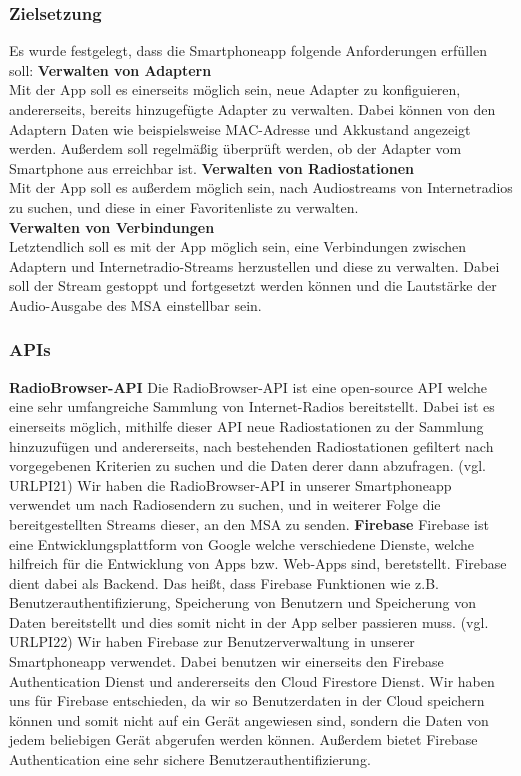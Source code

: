 \documentclass[11pt, twoside]{article}
\begin{document}
\subsubsection{Zielsetzung}
Es wurde festgelegt, dass die Smartphoneapp folgende Anforderungen erfüllen soll:
\vspace{4mm}\newline 
\textbf{Verwalten von Adaptern}  \\
Mit der App soll es einerseits möglich sein, neue Adapter zu konfiguieren, andererseits, bereits hinzugefügte Adapter zu verwalten. Dabei können von den Adaptern Daten wie beispielsweise MAC-Adresse und Akkustand angezeigt werden. Außerdem soll regelmäßig überprüft werden, ob der Adapter vom Smartphone aus erreichbar ist.
\vspace{4mm}\newline
\textbf{Verwalten von Radiostationen} \\
Mit der App soll es außerdem möglich sein, nach Audiostreams von Internetradios zu suchen, und diese in einer Favoritenliste zu verwalten. \newline \\
\textbf{Verwalten von Verbindungen} \\
Letztendlich soll es mit der App möglich sein, eine Verbindungen zwischen Adaptern und Internetradio-Streams herzustellen und diese zu verwalten. Dabei soll der Stream gestoppt und fortgesetzt werden können und die Lautstärke der Audio-Ausgabe des MSA einstellbar sein.
\subsubsection{APIs}
\textbf{RadioBrowser-API}
Die RadioBrowser-API ist eine open-source API welche eine sehr umfangreiche Sammlung von Internet-Radios bereitstellt. Dabei ist es einerseits möglich, mithilfe dieser API neue Radiostationen zu der Sammlung hinzuzufügen und andererseits, nach bestehenden Radiostationen gefiltert nach vorgegebenen Kriterien zu suchen und die Daten derer dann abzufragen. (vgl. URLPI21) Wir haben die RadioBrowser-API in unserer Smartphoneapp verwendet um nach Radiosendern zu suchen, und in weiterer Folge die bereitgestellten Streams dieser, an den MSA zu senden. 
\textbf{Firebase}
Firebase ist eine Entwicklungsplattform von Google welche verschiedene Dienste, welche hilfreich für die Entwicklung von Apps bzw. Web-Apps sind, beretstellt. Firebase dient dabei als Backend. Das heißt, dass Firebase Funktionen wie z.B. Benutzerauthentifizierung, Speicherung von Benutzern und Speicherung von Daten bereitstellt und dies somit nicht in der App selber passieren muss. (vgl. URLPI22) Wir haben Firebase zur Benutzerverwaltung in unserer Smartphoneapp verwendet. Dabei benutzen wir einerseits den Firebase Authentication Dienst und andererseits den Cloud Firestore Dienst. Wir haben uns für Firebase entschieden, da wir so Benutzerdaten in der Cloud speichern können und somit nicht auf ein Gerät angewiesen sind, sondern die Daten von jedem beliebigen Gerät abgerufen werden können. Außerdem bietet Firebase Authentication eine sehr sichere Benutzerauthentifizierung.
\end{document}
